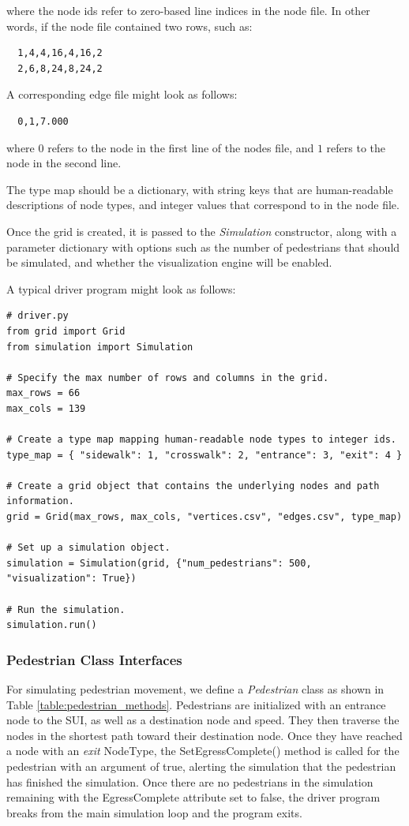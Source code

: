 \documentclass[12pt]{article}
\begin{document}
where the node ids refer to zero-based line indices in the node file. In other
words, if the node file contained two rows, such as:

\begin{lstlisting}
  1,4,4,16,4,16,2
  2,6,8,24,8,24,2
\end{lstlisting}

A corresponding edge file might look as follows:

\begin{lstlisting}
  0,1,7.000
\end{lstlisting}

where $0$ refers to the node in the first line of the nodes file, and $1$ refers
to the node in the second line.

The type map should be a dictionary, with string keys that are human-readable
descriptions of node types, and integer values that correspond to %
in the node file.

Once the grid is created, it is passed to the \textit{Simulation} constructor,
along with a parameter dictionary with options such as the number of pedestrians
that should be simulated, and whether the visualization engine will be enabled.

A typical driver program might look as follows:

\begin{lstlisting}
# driver.py
from grid import Grid
from simulation import Simulation

# Specify the max number of rows and columns in the grid.
max_rows = 66
max_cols = 139

# Create a type map mapping human-readable node types to integer ids.
type_map = { "sidewalk": 1, "crosswalk": 2, "entrance": 3, "exit": 4 }

# Create a grid object that contains the underlying nodes and path information.
grid = Grid(max_rows, max_cols, "vertices.csv", "edges.csv", type_map)

# Set up a simulation object.
simulation = Simulation(grid, {"num_pedestrians": 500, "visualization": True})

# Run the simulation.
simulation.run()
\end{lstlisting}

\subsubsection{Pedestrian Class Interfaces}
For simulating pedestrian movement, we define a \textit{Pedestrian} class as
shown in Table \ref{table:pedestrian_methods}. Pedestrians are initialized with
an entrance node to the SUI, as well as a destination node and speed. They then
traverse the nodes in the shortest path toward their destination node. Once
they have reached a node with an \textit{exit} NodeType, the
SetEgressComplete() method is called for the pedestrian with an argument of
true, alerting the simulation that the pedestrian has finished the simulation.
Once there are no pedestrians in the simulation remaining with the
EgressComplete attribute set to false, the driver program breaks from the main
simulation loop and the program exits.
\end{document}
